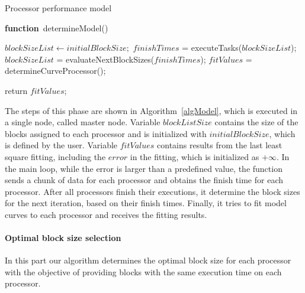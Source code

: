 \documentclass[journal]{IEEEtran}
\begin{document}


\begin{algorithm}

\caption{Processor performance model}
\label{algModel}

\begin{algorithmic}		

\STATE \textbf{function}~determineModel()

\STATE $blockSizeList \leftarrow initialBlockSize;$
		\STATE $finishTimes$ = executeTasks($blockSizeList$);
	        \STATE $blockSizeList$ = evaluateNextBlockSizes($finishTimes$);
		\STATE $fitValues$ = determineCurveProcessor();
\ENDWHILE

return $fitValues$;

\end{algorithmic}
\end{algorithm}


The steps of this phase are shown in Algorithm~\ref{algModel}, which is executed
in a single node, called master node. Variable $blockListSize$ contains the size
of the blocks assigned to each processor and is initialized with
$initialBlockSize$, which is defined by the user. Variable $fitValues$ contains
results from the last least square fitting, including the $error$ in the
fitting, which is initialized as $+\infty$. In the main loop, while the error is
larger than a predefined value, the function sends a chunk of data for each
processor and obtains the finish time for each processor. After all processors
finish their executions, it determine the block sizes for the next iteration,
based on their finish times. Finally, it tries to fit model curves to each
processor and receives the fitting results.

\vspace{0.2cm}
\paragraph*{Optimal block size selection} In this part our algorithm determines 
the optimal block size for each processor with the objective of providing blocks
with the same execution time on each processor.
\end{document}

